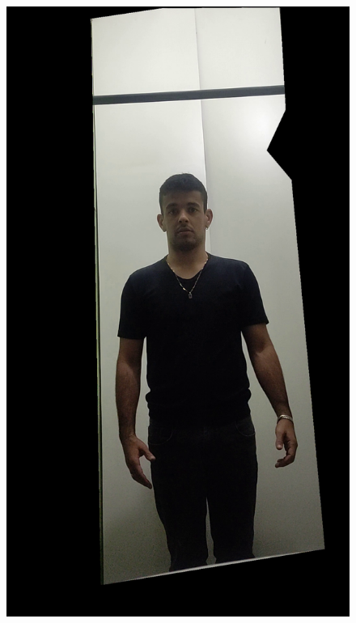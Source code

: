 \begin{figure}[htbp]
    \centering
        \begin{minipage}{0.45\textwidth}
            \includegraphics[width=\textwidth]{figuras/filter/canny/mask.png}
        \end{minipage}
        \begin{minipage}{0.45\textwidth}

\end{minipage}
\end{figure}
